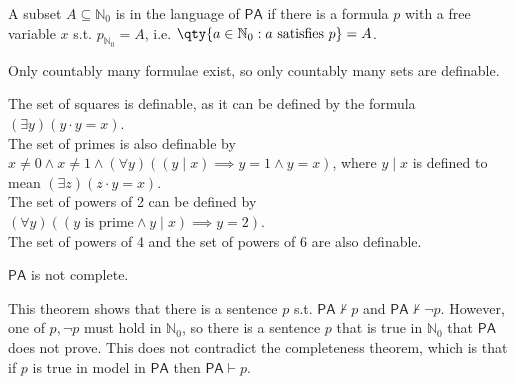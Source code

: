 \begin{definition}[Definable]
    A subset $A \subseteq \mathbb N_0$ is  in the language of $\mathsf{PA}$ if there is a formula $p$ with a free variable $x$ s.t. $p_{\mathbb{N}_0} = A$, i.e. $\qty{a \in \mathbb{N}_0 : a \text{ satisfies } p} = A$.
\end{definition}

Only countably many formulae exist, so only countably many sets are definable.

\begin{example}
    The set of squares is definable, as it can be defined by the formula $(\exists y)(y\cdot y = x)$. \\
    The set of primes is also definable by $x \neq 0 \wedge x \neq 1 \wedge (\forall y)((y \mid x) \implies y = 1 \wedge y = x)$, where $y \mid x$ is defined to mean $(\exists z)(z \cdot y = x)$. \\
    The set of powers of 2 can be defined by $(\forall y)((y \text{ is prime} \wedge y \mid x) \implies y = 2)$. \\
    The set of powers of 4 and the set of powers of 6 are also definable.
\end{example}

\begin{theorem}
    $\mathsf{PA}$ is not complete.
\end{theorem}

This theorem shows that there is a sentence $p$ s.t. $\mathsf{PA} \not\vdash p$ and $\mathsf{PA} \not\vdash \neg p$.
However, one of $p, \neg p$ must hold in $\mathbb N_0$, so there is a sentence $p$ that is true in $\mathbb N_0$ that $\mathsf{PA}$ does not prove.
This does not contradict the completeness theorem, which is that if $p$ is true in  model in $\mathsf{PA}$ then $\mathsf{PA} \vdash p$.